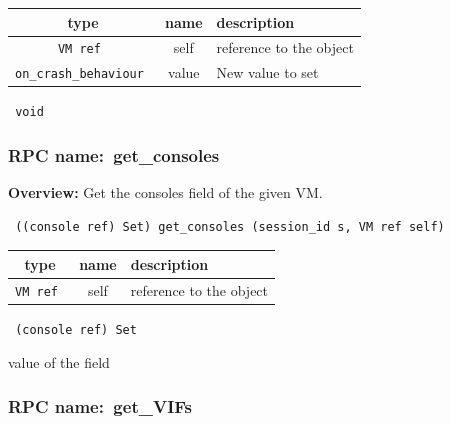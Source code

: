  
\vspace{0.3cm}
\begin{tabular}{|c|c|p{7cm}|}
 \hline
{\bf type} & {\bf name} & {\bf description} \\ \hline
{\tt VM ref } & self & reference to the object \\ \hline 

{\tt on\_crash\_behaviour } & value & New value to set \\ \hline 

\end{tabular}

\vspace{0.3cm}

{\tt 
void
}



\vspace{0.3cm}
\vspace{0.3cm}
\vspace{0.3cm}
\subsubsection{RPC name:~get\_consoles}

{\bf Overview:} 
Get the consoles field of the given VM.

\begin{verbatim} ((console ref) Set) get_consoles (session_id s, VM ref self)\end{verbatim}



 
\vspace{0.3cm}
\begin{tabular}{|c|c|p{7cm}|}
 \hline
{\bf type} & {\bf name} & {\bf description} \\ \hline
{\tt VM ref } & self & reference to the object \\ \hline 

\end{tabular}

\vspace{0.3cm}

{\tt 
(console ref) Set
}


value of the field
\vspace{0.3cm}
\vspace{0.3cm}
\vspace{0.3cm}
\subsubsection{RPC name:~get\_VIFs}


